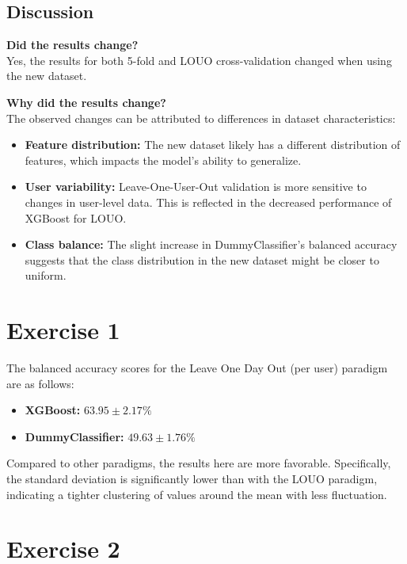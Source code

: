 \documentclass{article}
\begin{document}
\subsection*{Discussion}
\textbf{Did the results change?} \\
Yes, the results for both 5-fold and LOUO cross-validation changed when using the new dataset.

\textbf{Why did the results change?} \\
The observed changes can be attributed to differences in dataset characteristics:
\begin{itemize}
    \item \textbf{Feature distribution:} The new dataset likely has a different distribution of features, which impacts the model's ability to generalize.
    \item \textbf{User variability:} Leave-One-User-Out validation is more sensitive to changes in user-level data. This is reflected in the decreased performance of XGBoost for LOUO.
    \item \textbf{Class balance:} The slight increase in DummyClassifier's balanced accuracy suggests that the class distribution in the new dataset might be closer to uniform.
\end{itemize}

\section*{Exercise 1}

The balanced accuracy scores for the Leave One Day Out (per user) paradigm are as follows:
\begin{itemize}
    \item \textbf{XGBoost:} $63.95 \pm 2.17\%$
    \item \textbf{DummyClassifier:} $49.63 \pm 1.76\%$
\end{itemize}

Compared to other paradigms, the results here are more favorable. Specifically, the standard deviation is significantly lower than with the LOUO paradigm, indicating a tighter clustering of values around the mean with less fluctuation.

\section*{Exercise 2}
\end{document}
